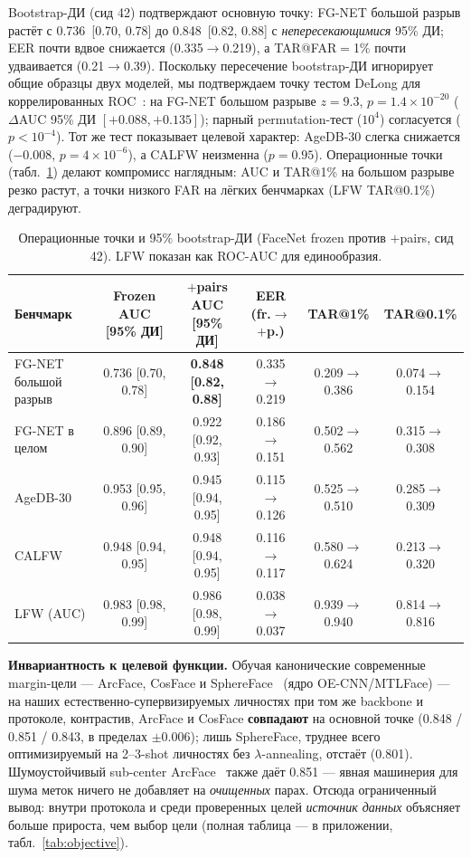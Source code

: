 \documentclass[10pt,twocolumn,letterpaper]{article}
\begin{document}
Bootstrap-ДИ (сид 42) подтверждают основную точку: FG-NET большой разрыв растёт с 0.736~[0.70, 0.78] до
0.848~[0.82, 0.88] с \emph{непересекающимися} 95\% ДИ; EER почти вдвое снижается (0.335$\to$0.219), а
TAR@FAR$=$1\% почти удваивается (0.21$\to$0.39). Поскольку пересечение bootstrap-ДИ игнорирует общие
образцы двух моделей, мы подтверждаем точку тестом DeLong для коррелированных ROC~\cite{delong1988}: на
FG-NET большом разрыве $z=9.3$, $p=1.4\times10^{-20}$ ($\Delta$AUC 95\% ДИ $[+0.088,+0.135]$); парный
permutation-тест ($10^4$) согласуется ($p<10^{-4}$). Тот же тест показывает целевой характер: AgeDB-30
слегка снижается ($-$0.008, $p=4\times10^{-6}$), а CALFW неизменна ($p=0.95$). Операционные точки
(табл.~\ref{tab:stats}) делают компромисс наглядным: AUC и TAR@1\% на большом разрыве резко растут, а
точки низкого FAR на лёгких бенчмарках (LFW TAR@0.1\%) деградируют.

\begin{table}[t]
\centering
\small
\begin{tabular}{@{}lccccc@{}}
\toprule
Бенчмарк & Frozen AUC [95\% ДИ] & $+$pairs AUC [95\% ДИ] & EER (fr.$\to$$+$p.) & TAR@1\% & TAR@0.1\% \\
\midrule
FG-NET большой разрыв & 0.736 [0.70, 0.78] & \textbf{0.848 [0.82, 0.88]} & 0.335$\to$0.219 & 0.209$\to$0.386 & 0.074$\to$0.154 \\
FG-NET в целом & 0.896 [0.89, 0.90] & 0.922 [0.92, 0.93] & 0.186$\to$0.151 & 0.502$\to$0.562 & 0.315$\to$0.308 \\
AgeDB-30 & 0.953 [0.95, 0.96] & 0.945 [0.94, 0.95] & 0.115$\to$0.126 & 0.525$\to$0.510 & 0.285$\to$0.309 \\
CALFW & 0.948 [0.94, 0.95] & 0.948 [0.94, 0.95] & 0.116$\to$0.117 & 0.580$\to$0.624 & 0.213$\to$0.320 \\
LFW (AUC) & 0.983 [0.98, 0.99] & 0.986 [0.98, 0.99] & 0.038$\to$0.037 & 0.939$\to$0.940 & 0.814$\to$0.816 \\
\bottomrule
\end{tabular}
\caption{Операционные точки и 95\% bootstrap-ДИ (FaceNet frozen против $+$pairs, сид 42). LFW показан как
ROC-AUC для единообразия.}
\label{tab:stats}
\end{table}

\textbf{Инвариантность к целевой функции.} Обучая канонические современные margin-цели — ArcFace,
CosFace и SphereFace~\cite{deng2019arcface} (ядро OE-CNN/MTLFace) — на наших естественно-супервизируемых
личностях при том же backbone и протоколе, контрастив, ArcFace и CosFace \textbf{совпадают} на основной
точке (0.848 / 0.851 / 0.843, в пределах $\pm$0.006); лишь SphereFace, труднее всего оптимизируемый на
2--3-shot личностях без $\lambda$-annealing, отстаёт (0.801). Шумоустойчивый sub-center
ArcFace~\cite{deng2020subcenter} также даёт 0.851 — явная машинерия для шума меток ничего не добавляет на
\emph{очищенных} парах. Отсюда ограниченный вывод: внутри протокола и среди проверенных целей
\emph{источник данных} объясняет больше прироста, чем выбор цели (полная таблица — в приложении,
табл.~\ref{tab:objective}).
\end{document}
